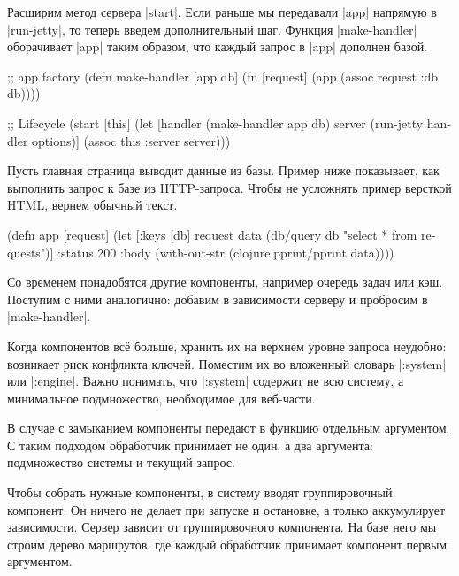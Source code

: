 Расширим метод сервера \spverb|start|. Если раньше мы передавали \spverb|app|
напрямую в \spverb|run-jetty|, то теперь введем дополнительный шаг. Функция
\spverb|make-handler| оборачивает \spverb|app| таким образом, что каждый запрос
в \spverb|app| дополнен базой.

\begin{english}
  \begin{clojure}
;; app factory
(defn make-handler [app db]
  (fn [request]
    (app (assoc request :db db))))

;; Lifecycle
(start [this]
  (let [handler (make-handler app db)
        server (run-jetty handler options)]
    (assoc this :server server)))
  \end{clojure}
\end{english}

Пусть главная страница выводит данные из базы. Пример ниже показывает, как
выполнить запрос к базе из HTTP-запроса. Чтобы не усложнять пример версткой
HTML, вернем обычный текст.

\begin{english}
  \begin{clojure}
(defn app [request]
  (let [{:keys [db]} request
        data (db/query db "select * from requests")]
    {:status 200
     :body (with-out-str
             (clojure.pprint/pprint data))}))
  \end{clojure}
\end{english}

Со временем понадобятся другие компоненты, например очередь задач или
кэш. Поступим с ними аналогично: добавим в зависимости серверу и пробросим в
\spverb|make-handler|.

Когда компонентов вс\"{е} больше, хранить их на верхнем уровне запроса неудобно:
возникает риск конфликта ключей. Поместим их во вложенный словарь
\spverb|:system| или \spverb|:engine|. Важно понимать, что \spverb|:system|
содержит не всю систему, а минимальное подмножество, необходимое для веб-части.

В случае с замыканием компоненты передают в функцию отдельным аргументом. С
таким подходом обработчик принимает не один, а два аргумента: подмножество
системы и текущий запрос.

Чтобы собрать нужные компоненты, в систему вводят группировочный компонент. Он
ничего не делает при запуске и остановке, а только аккумулирует
зависимости. Сервер зависит от группировочного компонента. На базе него мы
строим дерево маршрутов, где каждый обработчик принимает компонент первым
аргументом.

